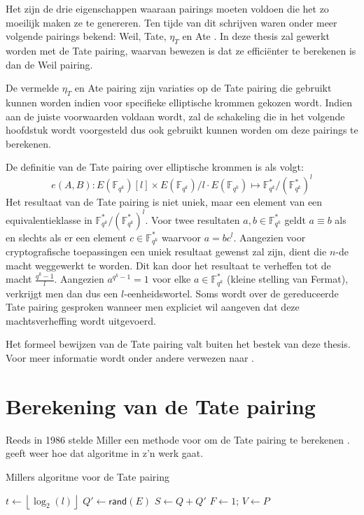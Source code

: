 Het zijn de drie eigenschappen waaraan pairings moeten voldoen die het zo moeilijk maken ze te genereren. Ten tijde van dit schrijven waren onder meer volgende pairings bekend: Weil, Tate, $\eta_T$ \cite{eta} en Ate \cite{ate}. In deze thesis zal gewerkt worden met de Tate pairing, waarvan bewezen is dat ze effici\"enter te berekenen is dan de Weil pairing.

De vermelde $\eta_T$ en Ate pairing zijn variaties op de Tate pairing die gebruikt kunnen worden indien voor specifieke elliptische krommen gekozen wordt. Indien aan de juiste voorwaarden voldaan wordt, zal de schakeling die in het volgende hoofdstuk wordt voorgesteld dus ook gebruikt kunnen worden om deze pairings te berekenen.

De definitie van de Tate pairing over elliptische krommen is als volgt:
\[e(A, B): E(\mathbb{F}_{q^k})[l] \times E(\mathbb{F}_{q^k})/l \cdot E(\mathbb{F}_{q^k}) \mapsto \mathbb{F}_{q^k}^* / (\mathbb{F}_{q^k}^*)^l\]
Het resultaat van de Tate pairing is niet uniek, maar een element van een equivalentieklasse in $\mathbb{F}_{q^k}^* / (\mathbb{F}_{q^k}^*)^l$. Voor twee resultaten $a, b \in \mathbb{F}_{q^k}^*$ geldt $a \equiv b$ als en slechts als er een element $c \in \mathbb{F}_{q^k}^*$ waarvoor $a = bc^l$. Aangezien voor cryptografische toepassingen een uniek resultaat gewenst zal zijn, dient die $n$-de macht weggewerkt te worden. Dit kan door het resultaat te verheffen tot de macht $\frac{q^k - 1 }{l}$. Aangezien $a^{q^k - 1} = 1$ voor elke $a \in \mathbb{F}_{q^k}^*$ (kleine stelling van Fermat), verkrijgt men dan dus een $l$-eenheidswortel. Soms wordt over de gereduceerde Tate pairing gesproken wanneer men expliciet wil aangeven dat deze machtsverheffing wordt uitgevoerd.

Het formeel bewijzen van de Tate pairing valt buiten het bestek van deze thesis. Voor meer informatie wordt onder andere verwezen naar \cite{maas, ruck, hess}.

\section{Berekening van de Tate pairing\label{sectie-pairings-berekening}}

Reeds in 1986 stelde Miller een methode voor om de Tate pairing te berekenen \cite{miller, barreto-efficient}.  geeft weer hoe dat algoritme in z'n werk gaat.

\begin{algorithm}[h]
	\caption{Millers algoritme voor de Tate pairing}
	\label{algoritme-pairings-miller}
	$t \gets \left\lfloor \log _2 (l) \right\rfloor$\;
	$Q' \gets \textsf{rand}(E)$\;
	$S \gets Q + Q'$\;
	$F \gets 1$; $V \gets P$\;	
\end{algorithm}

